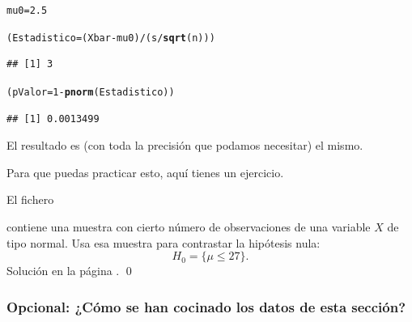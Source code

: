 \documentclass[10pt,a4paper]{article}\usepackage[]{graphicx}\usepackage[]{color}
\makeatletter
\newcommand{\hlnum}[1]{\textcolor[rgb]{0.686,0.059,0.569}{#1}}%
\newcommand{\hlopt}[1]{\textcolor[rgb]{0,0,0}{#1}}%
\newcommand{\hlstd}[1]{\textcolor[rgb]{0.345,0.345,0.345}{#1}}%
\newcommand{\hlkwb}[1]{\textcolor[rgb]{0.69,0.353,0.396}{#1}}%
\newcommand{\hlkwd}[1]{\textcolor[rgb]{0.737,0.353,0.396}{\textbf{#1}}}%
\newenvironment{kframe}{%
 \def\at@end@of@kframe{}%
 \ifinner\ifhmode%
  \def\at@end@of@kframe{\end{minipage}}%
  \begin{minipage}{\columnwidth}%
 \fi\fi%
 \def\FrameCommand##1{\hskip\@totalleftmargin \hskip-\fboxsep
 \colorbox{shadecolor}{##1}\hskip-\fboxsep
     \hskip-\linewidth \hskip-\@totalleftmargin \hskip\columnwidth}%
 \MakeFramed {\advance\hsize-\width
   \@totalleftmargin\z@ \linewidth\hsize
   \@setminipage}}%
 {\par\unskip\endMakeFramed%
 \at@end@of@kframe}
\newenvironment{knitrout}{}{} %
\newcounter {cont01}
\makeatother
\begin{document}
\begin{knitrout}
\color{fgcolor}\begin{kframe}
\begin{alltt}
\hlstd{mu0} \hlkwb{=} \hlnum{2.5}

\hlstd{(Estadistico} \hlkwb{=} \hlstd{(Xbar} \hlopt{-} \hlstd{mu0)} \hlopt{/} \hlstd{(s} \hlopt{/} \hlkwd{sqrt}\hlstd{(n)))}
\end{alltt}
\begin{verbatim}
## [1] 3
\end{verbatim}
\begin{alltt}
\hlstd{(pValor} \hlkwb{=} \hlnum{1} \hlopt{-} \hlkwd{pnorm}\hlstd{(Estadistico))}
\end{alltt}
\begin{verbatim}
## [1] 0.0013499
\end{verbatim}
\end{kframe}
\end{knitrout}
El resultado es (con toda la precisión que podamos necesitar) el mismo.

Para que puedas practicar esto, aquí tienes un ejercicio.

\begin{ejercicio}
\label{tut07:ejercicio08}

El fichero
\begin{center}
\end{center}
contiene una muestra con cierto número de observaciones de una variable $X$ de tipo normal. Usa esa muestra para contrastar la hipótesis nula:
\[
H_0 = \{\mu \leq 27\}.
\]
Solución en la página \pageref{tut07:ejercicio08:sol}.
\qed
\end{ejercicio}

\subsubsection*{Opcional: ¿Cómo se han cocinado los datos de esta sección?}
\end{document}
